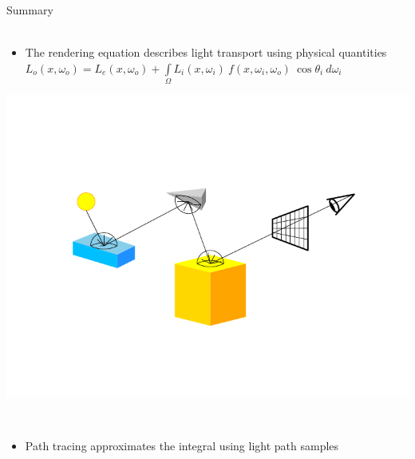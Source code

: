 \documentclass[utf8,stillsansserifmath,fleqn,t]{beamer}
\begin{document}
\begin{frame}
\frametitle{\insertsection}
Summary\\~\\
\begin{minipage}[t]{.59\textwidth}
\begin{itemize}
\item The rendering equation describes light transport using physical quantities\\
    $\displaystyle L_o(x, \omega_o) = L_e(x, \omega_o) +
    \int\limits_\Omega
    L_i(x,\omega_i)~f(x,\omega_i,\omega_o)~\cos\theta_i~d\omega_i$\\
\end{itemize}
\end{minipage}\hfill
\begin{minipage}[t]{.39\textwidth}
    \hphantom{~}
    \includegraphics[width=\textwidth]{./fig/path-tracing-0.pdf}
\end{minipage}\\
\begin{minipage}[t]{.59\textwidth}
\begin{itemize}
\item Path tracing approximates the integral using light path samples
\end{itemize}
\end{minipage}\hfill
\begin{minipage}[t]{.39\textwidth}
    \hphantom{~}

\end{minipage}
\end{frame}
\end{document}

